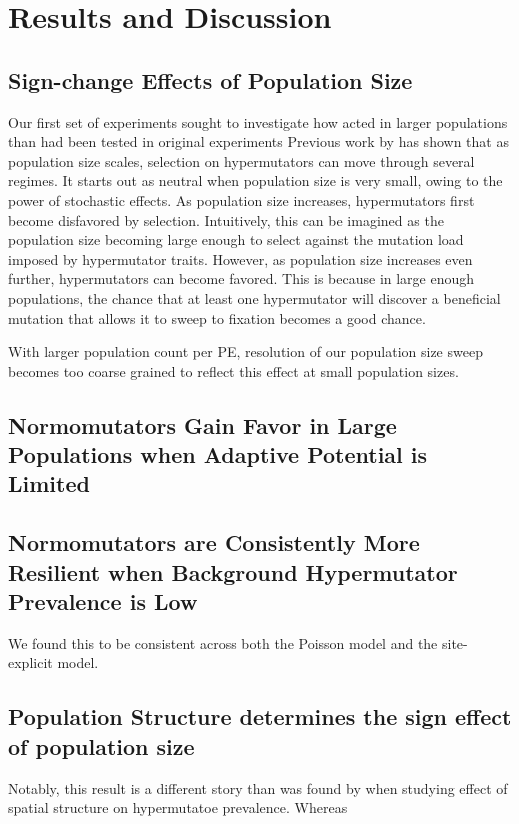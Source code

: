 \section{Results and Discussion} \label{sec:results}

\subsection{Sign-change Effects of Population Size}

Our first set of experiments sought to investigate how acted in larger populations than had been tested in original experiments
Previous work by \citet{raynes2018sign} has shown that as population size scales, selection on hypermutators can move through several regimes.
It starts out as neutral when population size is very small, owing to the power of stochastic effects.
As population size increases, hypermutators first become disfavored by selection.
Intuitively, this can be imagined as the population size becoming large enough to select against the mutation load imposed by hypermutator traits.
However, as population size increases even further, hypermutators can become favored.
This is because in large enough populations, the chance that at least one hypermutator will discover a beneficial mutation that allows it to sweep to fixation becomes a good chance.

With larger population count per PE, resolution of our population size sweep becomes too coarse grained to reflect this effect at small population sizes.



\subsection{Normomutators Gain Favor in Large Populations when Adaptive Potential is Limited}



\subsection{Normomutators are Consistently More Resilient when Background Hypermutator Prevalence is Low}



We found this to be consistent across both the Poisson model and the site-explicit model.

\subsection{Population Structure determines the sign effect of population size}



Notably, this result is a different story than was found by \citet{raynes2019migration} when studying effect of spatial structure on hypermutatoe prevalence.
Whereas
